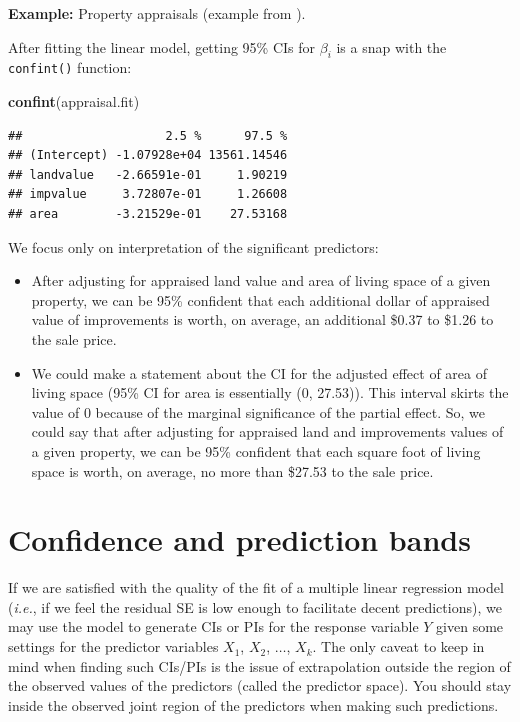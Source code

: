 \documentclass[
]{book}
\newenvironment{Shaded}{\begin{snugshade}}{\end{snugshade}}
\newcommand{\FunctionTok}[1]{\textcolor[rgb]{0.13,0.29,0.53}{\textbf{#1}}}
\newcommand{\NormalTok}[1]{#1}
\providecommand{\tightlist}{%
  \setlength{\itemsep}{0pt}\setlength{\parskip}{0pt}}
\begin{document}
\textbf{Example:} Property appraisals (example from \citet{McClaveSincich2008}).

After fitting the linear model, getting 95\% CIs for \(\beta_i\) is a snap with the \texttt{confint()} function:

\begin{Shaded}
\begin{Highlighting}[]
\FunctionTok{confint}\NormalTok{(appraisal.fit)}
\end{Highlighting}
\end{Shaded}

\begin{verbatim}
##                    2.5 %      97.5 %
## (Intercept) -1.07928e+04 13561.14546
## landvalue   -2.66591e-01     1.90219
## impvalue     3.72807e-01     1.26608
## area        -3.21529e-01    27.53168
\end{verbatim}

We focus only on interpretation of the significant predictors:

\begin{itemize}
\tightlist
\item
  After adjusting for appraised land value and area of living space of a given property, we can be 95\% confident that each additional dollar of appraised value of improvements is worth, on average, an additional \$0.37 to \$1.26 to the sale price.
\item
  We could make a statement about the CI for the adjusted effect of area of living space (95\% CI for area is essentially (0, 27.53)). This interval skirts the value of 0 because of the marginal significance of the partial effect. So, we could say that after adjusting for appraised land and improvements values of a given property, we can be 95\% confident that each square foot of living space is worth, on average, no more than \$27.53 to the sale price.
\end{itemize}

\hypertarget{confidence-and-prediction-bands}{%
\section{Confidence and prediction bands}\label{confidence-and-prediction-bands}}

If we are satisfied with the quality of the fit of a multiple linear regression model (\emph{i.e.}, if we feel the residual SE is low enough to facilitate decent predictions), we may use the model to generate CIs or PIs for the response variable \(Y\) given some settings for the predictor variables \(X_1\), \(X_2\), \(\ldots\), \(X_k\).
The only caveat to keep in mind when finding such CIs/PIs is the issue of extrapolation outside the region of the observed values of the predictors (called the predictor space).
You should stay inside the observed joint region of the predictors when making such predictions.
\end{document}
